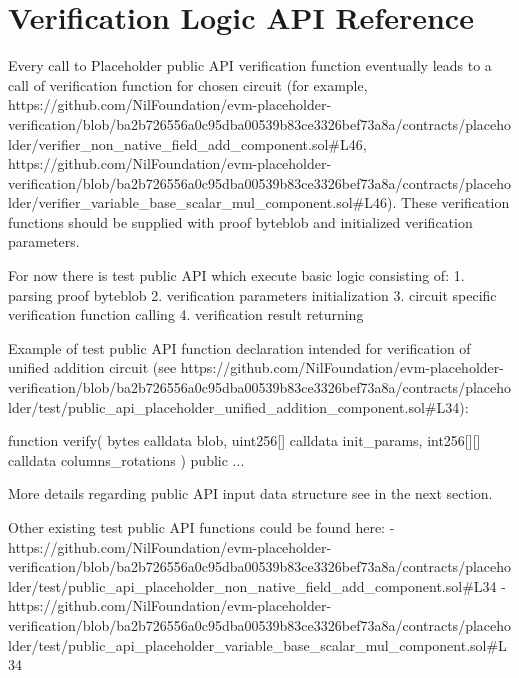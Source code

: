 \section{Verification Logic API Reference}

Every call to Placeholder public API verification function eventually leads to a call of verification function for chosen circuit (for example, https://github.com/NilFoundation/evm-placeholder-verification/blob/ba2b726556a0c95dba00539b83ce3326bef73a8a/contracts/placeholder/verifier_non_native_field_add_component.sol#L46, https://github.com/NilFoundation/evm-placeholder-verification/blob/ba2b726556a0c95dba00539b83ce3326bef73a8a/contracts/placeholder/verifier_variable_base_scalar_mul_component.sol#L46). 
These verification functions should be supplied with proof byteblob and initialized verification parameters.

For now there is test public API which execute basic logic consisting of:
1. parsing proof byteblob
2. verification parameters initialization
3. circuit specific verification function calling
4. verification result returning

Example of test public API function declaration intended for verification of unified addition circuit (see https://github.com/NilFoundation/evm-placeholder-verification/blob/ba2b726556a0c95dba00539b83ce3326bef73a8a/contracts/placeholder/test/public_api_placeholder_unified_addition_component.sol#L34):

function verify(
    bytes calldata blob,
    uint256[] calldata init_params,
    int256[][] calldata columns_rotations
) public {...}

More details regarding public API input data structure see in the next section.

Other existing test public API functions could be found here:
- https://github.com/NilFoundation/evm-placeholder-verification/blob/ba2b726556a0c95dba00539b83ce3326bef73a8a/contracts/placeholder/test/public_api_placeholder_non_native_field_add_component.sol#L34
- https://github.com/NilFoundation/evm-placeholder-verification/blob/ba2b726556a0c95dba00539b83ce3326bef73a8a/contracts/placeholder/test/public_api_placeholder_variable_base_scalar_mul_component.sol#L34
